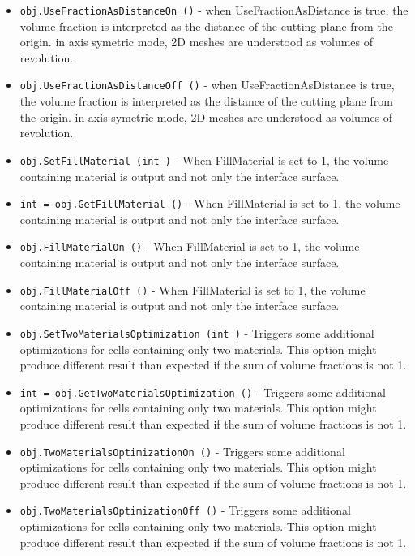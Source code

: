 \begin{itemize}
\item  \verb|obj.UseFractionAsDistanceOn ()| -  when UseFractionAsDistance is true, the volume fraction is interpreted as the distance
 of the cutting plane from the origin.
 in axis symetric mode, 2D meshes are understood as volumes of revolution.

\item  \verb|obj.UseFractionAsDistanceOff ()| -  when UseFractionAsDistance is true, the volume fraction is interpreted as the distance
 of the cutting plane from the origin.
 in axis symetric mode, 2D meshes are understood as volumes of revolution.

\item  \verb|obj.SetFillMaterial (int )| -  When FillMaterial is set to 1, the volume containing material is output and not only the interface surface.

\item  \verb|int = obj.GetFillMaterial ()| -  When FillMaterial is set to 1, the volume containing material is output and not only the interface surface.

\item  \verb|obj.FillMaterialOn ()| -  When FillMaterial is set to 1, the volume containing material is output and not only the interface surface.

\item  \verb|obj.FillMaterialOff ()| -  When FillMaterial is set to 1, the volume containing material is output and not only the interface surface.

\item  \verb|obj.SetTwoMaterialsOptimization (int )| -  Triggers some additional optimizations for cells containing only two materials. This option might produce different result than expected if the sum of volume fractions is not 1.

\item  \verb|int = obj.GetTwoMaterialsOptimization ()| -  Triggers some additional optimizations for cells containing only two materials. This option might produce different result than expected if the sum of volume fractions is not 1.

\item  \verb|obj.TwoMaterialsOptimizationOn ()| -  Triggers some additional optimizations for cells containing only two materials. This option might produce different result than expected if the sum of volume fractions is not 1.

\item  \verb|obj.TwoMaterialsOptimizationOff ()| -  Triggers some additional optimizations for cells containing only two materials. This option might produce different result than expected if the sum of volume fractions is not 1.


\end{itemize}
